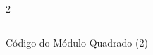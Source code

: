 \begin{figure}[H]
    \centering   
    \begin{tcolorbox}  
        \begin{multicols}{2} 
        \fontsize{9pt}{9pt}\selectfont\inputminted[obeytabs=true,tabsize=4,xleftmargin=20pt,linenos,breaklines,firstline=96]{VHDL}{VHDL/files/Square.vhd}    
        \end{multicols}
    \end{tcolorbox}   
    \caption{Código do Módulo Quadrado (2)}
\end{figure}